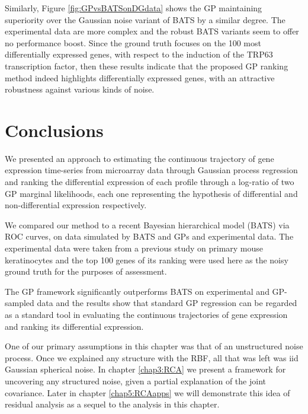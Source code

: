       Similarly, Figure \ref{fig:GPvsBATSonDGdata} shows the GP maintaining superiority over the
      Gaussian noise variant of BATS by a similar degree. The experimental data are more
      complex and the robust BATS variants seem to offer no performance boost.
      Since the ground truth focuses on the 100 most differentially
      expressed genes, with respect to the induction of the TRP63 transcription
      factor, then these results indicate that the proposed GP ranking method
      indeed highlights differentially expressed genes, with an attractive
      robustness against various kinds of noise.


  \section{Conclusions} \label{sec:chap2_conclusions}
    We presented an approach to estimating the continuous trajectory of gene expression time-series from microarray data through Gaussian process regression and ranking the differential expression of each profile through a log-ratio of two GP marginal likelihoods, each one representing the hypothesis of differential and non-differential expression respectively.
    
    We compared our method to a recent Bayesian hierarchical model (BATS) via ROC curves, on data simulated by BATS and GPs and experimental data.
    The experimental data were taken from a previous study on primary mouse keratinocytes and the top 100 genes of its ranking were used here as the noisy ground truth for the purposes of assessment.
    
    The GP framework significantly outperforms BATS on experimental and GP-sampled data and the results show that standard GP regression can be regarded as a standard tool in evaluating the continuous trajectories of gene expression and ranking its differential expression.
    
    One of our primary assumptions in this chapter was that of an unstructured noise process. Once we explained any structure with the RBF, all that was left was iid Gaussian spherical noise.
    In chapter \ref{chap3:RCA} we present a framework for uncovering any structured noise, given a partial explanation of the joint covariance.
    Later in chapter \ref{chap5:RCAapps} we will demonstrate this idea of residual analysis as a sequel to the analysis in this chapter.

